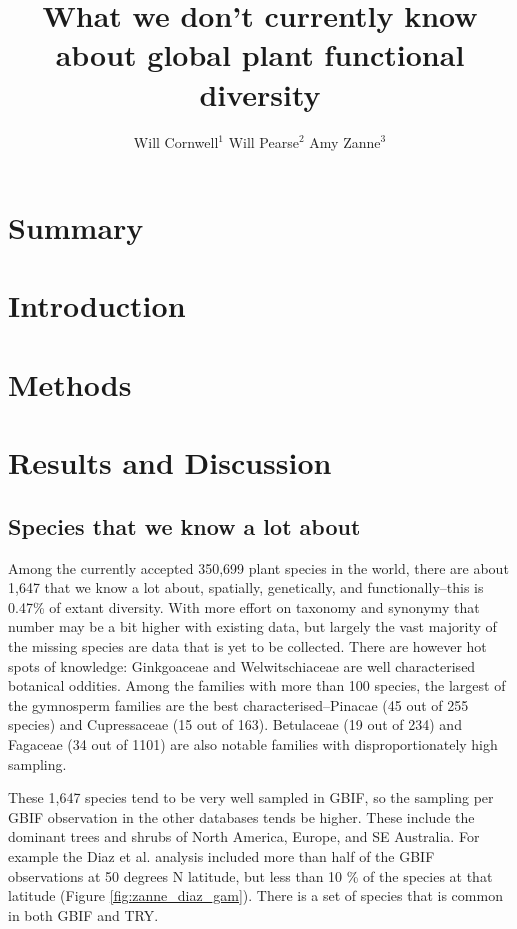 \documentclass[a4paper,11pt]{article}
\title{What we don't currently know about global plant functional diversity}
\author{
Will Cornwell$^1$
Will Pearse$^2$
Amy Zanne$^3$}
\affiliation{
*final list and order undecided\\
$^1$ University of NSW\\
$^2$ somewhere between Wales and Canada?\\
$^3$ global vagabond}
\date{}
\begin{document}
\mstitlepage
\noindent

\section{Summary}


\section{Introduction}

\section{Methods}

\section{Results and Discussion}

\subsection{Species  that we know a lot about}

Among the currently accepted 350,699 plant species in the world, there are about 1,647 that we know a lot about, spatially, genetically, and functionally--this is 0.47\% of extant diversity.  With more effort on taxonomy and synonymy that number may be a bit higher with existing data, but largely the vast majority of the missing species are  data that is yet to be collected.  There are however hot spots of knowledge: Ginkgoaceae and Welwitschiaceae are well characterised botanical oddities.  Among the families with more than 100 species, the largest of the gymnosperm families are the best characterised--Pinacae (45 out of 255 species) and Cupressaceae (15 out of 163). Betulaceae (19 out of 234) and Fagaceae (34 out of 1101) are also notable families with disproportionately high sampling.  

These 1,647 species tend to be very well sampled in GBIF, so the sampling per GBIF observation in the other databases tends be higher.  These include the dominant trees and shrubs of North America, Europe, and SE Australia.  For example the Diaz et al. analysis included more than half of the GBIF observations at 50 degrees N latitude, but less than 10 \% of the species at that latitude (Figure \ref{fig:zanne_diaz_gam}).  There is a set of species that is common in both GBIF and TRY.  
\end{document}
